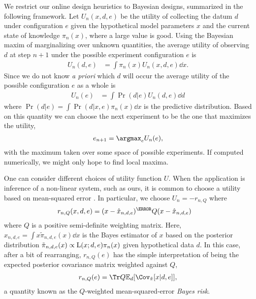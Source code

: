 \documentclass[aps,nofootinbib,twocolumn,superscriptaddress]{revtex4}
\newcommand{\mps}{x}
\newcommand{\eps}{e}
\newcommand{\data}{d}
\begin{document}
We restrict our online design heuristics to Bayesian designs,
summarized in the following framework.
Let $U_n(\mps,\data,\eps)$ be the utility of collecting the datum
$\data$ under configuration $\eps$ given the hypothetical
model parameters $\mps$ and the current state of knowledge $\pi_n(\mps)$,
where a large value is good.
Using the Bayesian maxim of marginalizing over unknown quantities,
the average utility of observing $\data$ at step $n+1$ under
the possible experiment configuration $\eps$ is
\begin{align}
    U_n(\data,\eps)
        &= \int \pi_n(\mps)U_n(\mps,\data,\eps)\dd\mps.
\end{align}
Since we do not know \textit{a priori} which $\data$ will
occur the average utility of the possible configuration $\eps$ as a whole is
\begin{align}
    U_n(\eps)
        &= \int\Pr(\data|\eps)U_n(\data,\eps) \dd\data
\end{align}
where $\Pr(\data|\eps)=\int \Pr(\data|\mps,\eps)\pi_n(\mps)\dd\mps$ is the
predictive distribution.
Based on this quantity we can choose the next experiment to be
the one that maximizes the utility,
\begin{align}
    \eps_{n+1} = \argmax_\eps U_n(\eps),
\end{align}
with the maximum taken over some space of possible experiments.
If computed numerically, we might only hope to find local maxima.

One can consider different choices of utility function $U$.
When the application is inference of a non-linear system, such as
ours, it is common to choose a utility based on
mean-squared error \cite{chaloner_bayesian_1995}.
In particular, we choose $U_n=-r_{n,Q}$ where
\begin{align}
    r_{n,Q}(\mps,\data,\eps)
        &= (\mps - \hat\mps_{n,\data,\eps})^\T Q (\mps - \hat\mps_{n,\data,\eps})
\end{align}
where $Q$ is a positive semi-definite weighting matrix.
Here, $\hat{\mps}_{n,\data,\eps}=\int \mps \tilde{\pi}_{n,\data,\eps}(\mps)\dd\mps$
is the Bayes estimator of $\mps$ based on the posterior distribution
$\tilde{\pi}_{n,\data,\eps}(\mps)\propto \Lhood(\mps;\data,\eps)\pi_n(\mps)$
given hypothetical data $\data$.
In this case, after a bit of rearranging,
$r_{n,Q}(\eps)$ has the simple interpretation
of being the expected posterior covariance matrix weighted
against $Q$,
\begin{align}
    r_{n,Q}(\eps) = \Tr Q\expect_\data[\Cov_{\tilde{\pi}}
        [\mps|\data,\eps]],
    \label{eq:bayes-risk}
\end{align}
a quantity known as the $Q$-weighted
mean-squared-error \textit{Bayes risk}.
\end{document}
